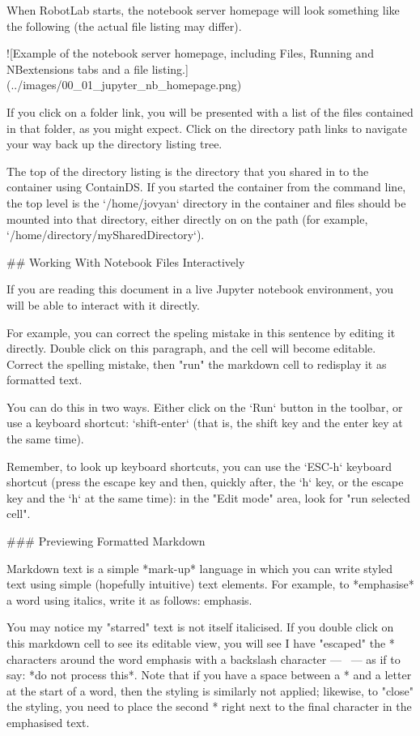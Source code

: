 \documentclass[letterpaper,10pt,english]{sphinxmanual}
\begin{document}
When RobotLab starts, the notebook server homepage will look something like the following (the actual file listing may differ).

![Example of the notebook server homepage, including Files, Running and NBextensions tabs and a file listing.](../images/00_01_jupyter_nb_homepage.png)


If you click on a folder link, you will be presented with a list of the files contained in that folder, as you might expect. Click on the directory path links to navigate your way back up the directory listing tree.

The top of the directory listing is the directory that you shared in to the container using ContainDS. If you started the container from the command line, the top level is the `/home/jovyan` directory in the container and files should be mounted into that directory, either directly on on the path (for example, `/home/directory/mySharedDirectory`).


## Working With Notebook Files Interactively

If you are reading this document in a live Jupyter notebook environment, you will be able to interact with it directly.


For example, you can correct the speling mistake in this sentence by editing it directly. Double click on this paragraph, and the cell will become editable. Correct the spelling mistake, then "run" the markdown cell to redisplay it as formatted text.

You can do this in two ways. Either click on the `Run` button in the toolbar, or use a keyboard shortcut: `shift-enter` (that is, the shift key and the enter key at the same time).

Remember, to look up keyboard shortcuts, you can use the `ESC-h` keyboard shortcut (press the escape key and then, quickly after, the `h` key, or the escape key and the `h` at the same time): in the "Edit mode" area, look for "run selected cell".


### Previewing Formatted Markdown

Markdown text is a simple *mark-up* language in which you can write styled text using simple (hopefully intuitive) text elements. For example, to *emphasise* a word using italics, write it as follows: \*emphasis\*.

You may notice my "starred" text is not itself italicised. If you double click on this markdown cell to see its editable view, you will see I have "escaped" the * characters around the word \*emphasis\* with a backslash character — \ — as if to say: *do not process this*. Note that if you have a space between a * and a letter at the start of a word, then the styling is similarly not applied; likewise, to "close" the styling, you need to place the second * right next to the final character in the emphasised text.
\end{document}
